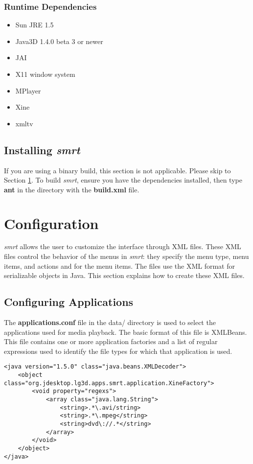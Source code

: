 \documentclass[letterpaper, titlepage, 11pt]{article}
\begin{document}
\subsubsection{Runtime Dependencies}
\begin{itemize}
\item Sun JRE 1.5
\item Java3D 1.4.0 beta 3 or newer
\item JAI
\item X11 window system
\item MPlayer
\item Xine
\item xmltv
\end{itemize}

\subsection{Installing \textit{smrt}}
If you are using a binary build, this section is not applicable.  Please skip to
Section \ref{sec:config}.  To build \textit{smrt}, ensure you have the
dependencies installed, then type \textbf{ant} in the directory with the
\textbf{build.xml} file.

\section{Configuration}
\label{sec:config}
\textit{smrt} allows the user to customize the interface through XML files.
These XML files control the behavior of the menus in \textit{smrt}: they specify
the menu type, menu items, and actions and for the menu items.  The files use
the XML format for serializable objects in Java.  This section explains how to
create these XML files.

\subsection{Configuring Applications}
\label{sec:appconf}
The \textbf{applications.conf} file in the data/ directory is used to select
the applications used for media playback.  The basic format of this file is
XMLBeans.  This file contains one or more application factories and a list of
regular expressions used to identify the file types for which that
application is used.

\begin{verbatim}
<java version="1.5.0" class="java.beans.XMLDecoder">
    <object class="org.jdesktop.lg3d.apps.smrt.application.XineFactory">
        <void property="regexs">
            <array class="java.lang.String">
                <string>.*\.avi/string>
                <string>.*\.mpeg</string>
                <string>dvd\://.*</string>
            </array>
        </void>
    </object>
</java>
\end{verbatim}
\end{document}
